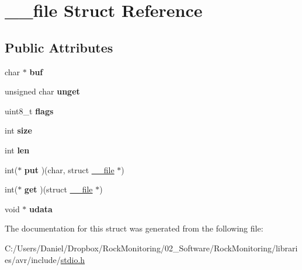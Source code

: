\hypertarget{struct____file}{}\section{\+\_\+\+\_\+file Struct Reference}
\label{struct____file}
\subsection*{Public Attributes}
\begin{DoxyCompactItemize}
\item 
char $\ast$ {\bfseries buf}\hypertarget{struct____file_a3e5a85ae919a90efbb7cb44ccb54fe46}{}\label{struct____file_a3e5a85ae919a90efbb7cb44ccb54fe46}

\item 
unsigned char {\bfseries unget}\hypertarget{struct____file_a1d139ae3cb11a1fada469a49f7d3d3b6}{}\label{struct____file_a1d139ae3cb11a1fada469a49f7d3d3b6}

\item 
uint8\+\_\+t {\bfseries flags}\hypertarget{struct____file_a8d11df8679502efee09740f97d7c277b}{}\label{struct____file_a8d11df8679502efee09740f97d7c277b}

\item 
int {\bfseries size}\hypertarget{struct____file_aff4a1ca8b6a12460812928afae81248d}{}\label{struct____file_aff4a1ca8b6a12460812928afae81248d}

\item 
int {\bfseries len}\hypertarget{struct____file_a30309efd13a75ed510bb2370debafaf8}{}\label{struct____file_a30309efd13a75ed510bb2370debafaf8}

\item 
int($\ast$ {\bfseries put} )(char, struct \hyperlink{struct____file}{\+\_\+\+\_\+file} $\ast$)\hypertarget{struct____file_a01c8b217e42cc11b6a7f8429114e9d46}{}\label{struct____file_a01c8b217e42cc11b6a7f8429114e9d46}

\item 
int($\ast$ {\bfseries get} )(struct \hyperlink{struct____file}{\+\_\+\+\_\+file} $\ast$)\hypertarget{struct____file_a2d816b077c3af0425344fe4b283dad33}{}\label{struct____file_a2d816b077c3af0425344fe4b283dad33}

\item 
void $\ast$ {\bfseries udata}\hypertarget{struct____file_abe6f3bdb4df4119277132eb3e13a4628}{}\label{struct____file_abe6f3bdb4df4119277132eb3e13a4628}

\end{DoxyCompactItemize}


The documentation for this struct was generated from the following file\+:\begin{DoxyCompactItemize}
\item 
C\+:/\+Users/\+Daniel/\+Dropbox/\+Rock\+Monitoring/02\+\_\+\+Software/\+Rock\+Monitoring/libraries/avr/include/\hyperlink{stdio_8h}{stdio.\+h}\end{DoxyCompactItemize}
